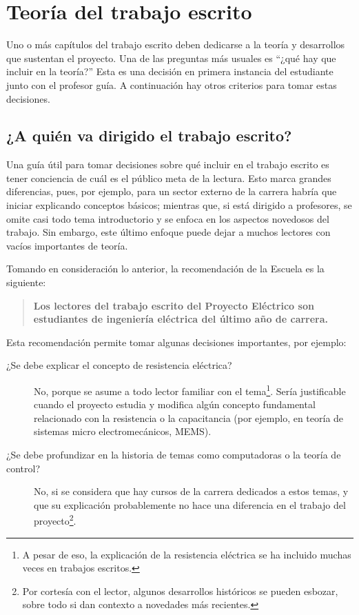   \chapter{Teoría del trabajo escrito} 
\label{C:antecedentes}

Uno o más capítulos del trabajo escrito deben dedicarse a la teoría y desarrollos que sustentan el proyecto. Una de las preguntas más usuales es ``¿qué hay que incluir en la teoría?'' Esta es una decisión en primera instancia del estudiante junto con el profesor guía. A continuación hay otros criterios para tomar estas decisiones.

\section{¿A quién va dirigido el trabajo escrito?}

Una guía útil para tomar decisiones sobre qué incluir en el trabajo escrito es tener conciencia de cuál es el público meta de la lectura. Esto marca grandes diferencias, pues, por ejemplo, para un sector externo de la carrera habría que iniciar explicando conceptos básicos; mientras que, si está dirigido a profesores, se omite casi todo tema introductorio y se enfoca en los aspectos novedosos del trabajo. Sin embargo, este último enfoque puede dejar a muchos lectores con vacíos importantes de teoría.

Tomando en consideración lo anterior, la recomendación de la Escuela es la siguiente:

\begin{quote}
\bfseries\centering
Los lectores del trabajo escrito del Proyecto Eléctrico son \\ estudiantes de ingeniería eléctrica del último año de carrera.
\end{quote}

Esta recomendación permite tomar algunas decisiones importantes, por ejemplo:

\begin{description}
\item[¿Se debe explicar el concepto de resistencia eléctrica?] No, porque se asume a todo lector familiar con el tema\footnote{A pesar de eso, la explicación de la resistencia eléctrica se ha incluido muchas veces en trabajos escritos.}. Sería justificable cuando el proyecto estudia y modifica algún concepto fundamental relacionado con la resistencia o la capacitancia (por ejemplo, en teoría de sistemas micro electromecánicos, MEMS).
\item[¿Se debe profundizar en la historia de temas como computadoras o la teoría de control?] No, si se considera que hay cursos de la carrera dedicados a estos temas, y que su explicación probablemente no hace una diferencia en el trabajo del proyecto\footnote{Por cortesía con el lector, algunos desarrollos históricos se pueden esbozar, sobre todo si dan contexto a novedades más recientes.}.
\end{description}

